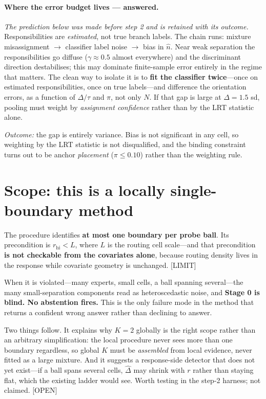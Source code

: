 \documentclass[11pt]{article}
\newcommand{\nhat}{\hat{n}}
\newcommand{\Dhat}{\hat{\Delta}}
\newcommand{\provtag}[2]{{\footnotesize\sffamily\textcolor{#1}{[#2]}}}
\newcommand{\OPENT}{\provtag{openamber}{OPEN}}
\newcommand{\LIMIT}{\provtag{limred}{LIMIT}}
\begin{document}
\paragraph{Where the error budget lives --- answered.} \emph{The prediction below was made
before step 2 and is retained with its outcome.} Responsibilities are
\emph{estimated}, not true branch labels. The chain runs: mixture misassignment $\to$ classifier
label noise $\to$ bias in $\nhat$. Near weak separation the responsibilities go diffuse
($\gamma \approx 0.5$ almost everywhere) and the discriminant direction destabilises; this may
dominate finite-sample error entirely in the regime that matters. The clean way to isolate it is to
\textbf{fit the classifier twice}---once on estimated responsibilities, once on true labels---and
difference the orientation errors, as a function of $\Delta/\tau$ and $\pi$, not only $N$. If that
gap is large at $\Delta = 1.5$ sd, pooling must weight by \emph{assignment confidence} rather than
by the LRT statistic alone.

\emph{Outcome:} the gap is entirely variance. Bias is not significant in any cell, so
weighting by the LRT statistic is not disqualified, and the binding constraint turns out to
be anchor \emph{placement} ($\pi \le 0.10$) rather than the weighting rule.

\section{Scope: this is a locally single-boundary method}
\label{sec:scope}

\begin{limitbox}
\noindent The procedure identifies \textbf{at most one boundary per probe ball}. Its precondition
is $r_{\text{hi}} < L$, where $L$ is the routing cell scale---and that precondition \textbf{is not
checkable from the covariates alone}, because routing density lives in the response while
covariate geometry is unchanged. \LIMIT
\end{limitbox}

\noindent When it is violated---many experts, small cells, a ball spanning several---the many
small-separation components read as heteroscedastic noise, and \textbf{Stage 0 is blind. No
abstention fires.} This is the only failure mode in the method that returns a confident wrong
answer rather than declining to answer.

Two things follow. It explains why $K = 2$ globally is the right scope rather than an arbitrary
simplification: the local procedure never sees more than one boundary regardless, so global $K$
must be \emph{assembled} from local evidence, never fitted as a large mixture. And it suggests a
response-side detector that does not yet exist---if a ball spans several cells, $\Dhat$ may shrink
with $r$ rather than staying flat, which the existing ladder would see. Worth testing in the
step-2 harness; not claimed. \OPENT
\end{document}
